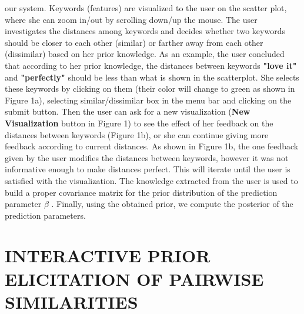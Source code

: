 \documentclass{sig-alternate}
\begin{document}
our system. Keywords (features) are visualized to the user on the
scatter plot, where she can zoom in/out by scrolling down/up the
mouse. The user investigates the distances among keywords and
decides whether two keywords should be closer to each other (similar)
or farther away from each other (dissimilar) based on her prior
knowledge. As an example, the user concluded that according to her
prior knowledge, the distances between keywords \textbf{"love it"} and
\textbf{"perfectly"} should be less than what is shown in the scatterplot.
She selects these keywords by clicking on them (their color will
change to green as shown in Figure 1a), selecting similar/dissimilar
box in the menu bar and clicking on the submit button. Then the
user can ask for a new visualization (\textbf{New Visualization} button in
Figure 1) to see the effect of her feedback on the distances between
keywords (Figure 1b), or she can continue giving more feedback
according to current distances. As shown in Figure 1b, the one feedback
given by the user modifies the distances between keywords,
however it was not informative enough to make distances perfect.
This will iterate until the user is satisfied with the visualization.
The knowledge extracted from the user is used to build a proper
covariance matrix for the prior distribution of the prediction parameter
$\beta$ . Finally, using the obtained prior, we compute the posterior
of the prediction parameters.


\section{INTERACTIVE PRIOR ELICITATION OF PAIRWISE SIMILARITIES}
\end{document}
